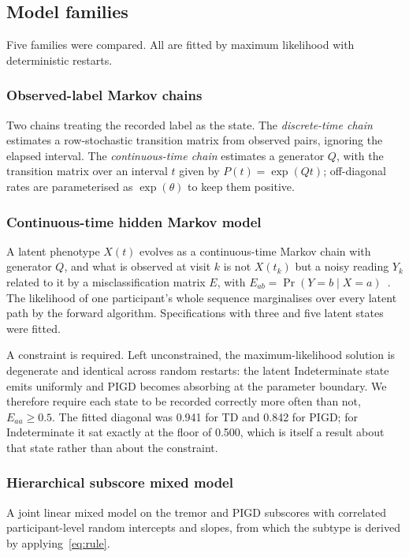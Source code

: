 \documentclass[journal]{IEEEtran}
\begin{document}
\subsection{Model families}
Five families were compared. All are fitted by maximum likelihood with
deterministic restarts.

\subsubsection{Observed-label Markov chains}
Two chains treating the recorded label as the state. The \emph{discrete-time
chain} estimates a row-stochastic transition matrix from observed pairs,
ignoring the elapsed interval. The \emph{continuous-time chain} estimates a
generator $Q$, with the transition matrix over an interval $t$ given by
$P(t)=\exp(Qt)$; off-diagonal rates are parameterised as $\exp(\theta)$ to keep
them positive.

\subsubsection{Continuous-time hidden Markov model}
A latent phenotype $X(t)$ evolves as a continuous-time Markov chain with
generator $Q$, and what is observed at visit $k$ is not $X(t_k)$ but a noisy
reading $Y_k$ related to it by a misclassification matrix $E$, with
$E_{ab}=\Pr(Y=b \mid X=a)$~\cite{jackson2011}. The likelihood of one
participant's whole sequence marginalises over every latent path by the forward
algorithm. Specifications with three and five latent states were fitted.

A constraint is required. Left unconstrained, the maximum-likelihood solution is
degenerate and identical across random restarts: the latent Indeterminate state
emits uniformly and PIGD becomes absorbing at the parameter boundary. We
therefore require each state to be recorded correctly more often than not,
$E_{aa} \geq 0.5$. The fitted diagonal was 0.941 for TD and 0.842 for PIGD; for
Indeterminate it sat exactly at the floor of 0.500, which is itself a result
about that state rather than about the constraint.

\subsubsection{Hierarchical subscore mixed model}
A joint linear mixed model on the tremor and PIGD subscores with correlated
participant-level random intercepts and slopes, from which the subtype is
derived by applying~\eqref{eq:rule}.
\end{document}
